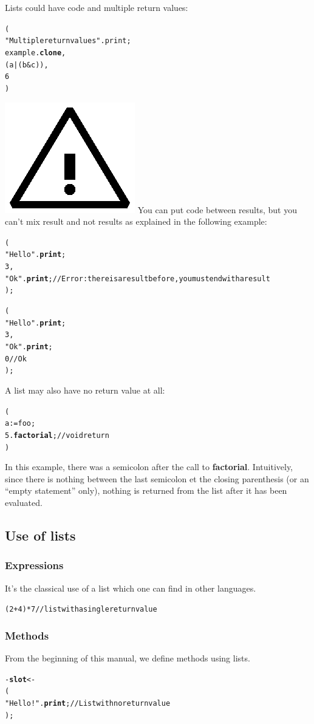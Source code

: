 \documentclass[11pt]{mybook}
\newcommand{\warning}{\includegraphics[scale=0.3]{figures/warning}}
\begin{document}
Lists could have code and multiple return values:
\begin{alltt}
  (
    "Multiple return values".print;
    {\sc{}example}.{\bf{}clone},
    (a | (b & c)),
    6
  )
\end{alltt}

\warning{} You can put code between results, but you can't mix result and not results as explained in the following example:
\begin{alltt}
  (
    "Hello".{\bf{}print};
    3,
    "Ok".{\bf{}print};   // Error: there is a result before, you must end with a result
  );

  (
    "Hello".{\bf{}print};
    3,
    "Ok".{\bf{}print};
    0                    // Ok
  );
\end{alltt}

A list may also have no return value at all:
\begin{alltt}
  (
    a := foo;
    5.{\bf{}factorial};  // void return
  )
\end{alltt}
In this example, there was a semicolon after the call to {\bf{}factorial}.
Intuitively, since there is nothing between the last semicolon et the
closing parenthesis (or an ``empty statement'' only), nothing is
returned from the list after it has been evaluated.

\subsection{Use of lists}
\label{language_reference:lists:use}
\subsubsection{Expressions}
\label{language_reference:lists:use:expressions}
It's the classical use of a {\sc{}list} which one can find in other languages.
\begin{alltt}
  ( 2 + 4 ) * 7   // list with a single return value
\end{alltt}

\subsubsection{Methods}
\label{language_reference:lists:use:methods}
From the beginning of this manual, we define methods using lists.
\begin{alltt}
  - {\bf{}slot} <-
  (
     "Hello !".{\bf{}print};      // List with no return value
  );                          
\end{alltt}
\end{document}
